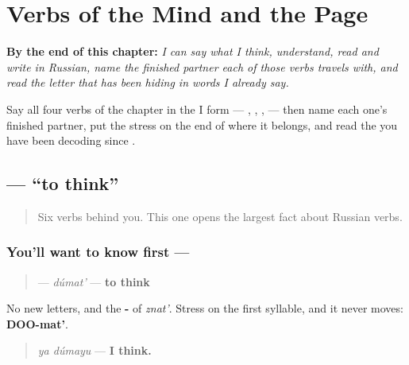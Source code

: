 
\chapter{Verbs of the Mind and the Page}
\label{ch:russian-verbs-of-the-mind}

\begin{chapteropening}
\textbf{By the end of this chapter:} \emph{I can say what I think, understand, read and write in Russian, name the finished partner each of those verbs travels with, and read the letter  that has been hiding in words I already say.}

Say all four verbs of the chapter in the I form —  ,  ,  ,   — then name each one's finished partner, put the stress on the end of  where it belongs, and read the  you have been decoding since .
\end{chapteropening}

\section[\texorpdfstring{\ru{думать} (dúmat')}{думать (dúmat')}]{ — \textquotedblleft{}to think\textquotedblright{}}

\label{lesson:RU-C04-dumat}



\begin{quote}
Six verbs behind you. This one opens the largest fact about Russian verbs.
\end{quote}

\subsection*{You'll want to know first — }
\begin{quote}
\textbf{} — \emph{dúmat'} — \textbf{to think}
\end{quote}

No new letters, and the \textbf{-} of \emph{znat'}. Stress on the first syllable, and it never moves: \textbf{DOO-mat'}.

\begin{quote}
\emph{ya dúmayu} — \textbf{I think.}
\end{quote}

